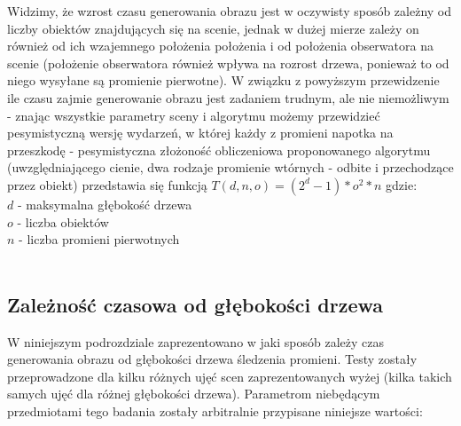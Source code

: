 Widzimy, że wzrost czasu generowania obrazu jest w oczywisty sposób zależny od liczby obiektów znajdujących się na scenie, jednak w dużej mierze zależy on również od ich wzajemnego położenia położenia i od położenia obserwatora na scenie (położenie obserwatora również wpływa na rozrost drzewa, ponieważ to od niego wysyłane są promienie pierwotne). W związku z powyższym przewidzenie ile czasu zajmie generowanie obrazu jest zadaniem trudnym, ale nie niemożliwym - znając wszystkie parametry sceny i algorytmu możemy przewidzieć pesymistyczną wersję wydarzeń, w której każdy z promieni napotka na przeszkodę - pesymistyczna złożoność obliczeniowa proponowanego algorytmu (uwzględniającego cienie, dwa rodzaje promienie wtórnych - odbite i przechodzące przez obiekt) przedstawia się funkcją $T(d,n,o) = (2^d - 1) * o^2 * n$ gdzie:
\\
$d$ - maksymalna głębokość drzewa \\
$o$ - liczba obiektów \\
$n$ - liczba promieni pierwotnych \\ 
\\

\subsection{Zależność czasowa od głębokości drzewa}

W niniejszym podrozdziale zaprezentowano w jaki sposób zależy czas generowania obrazu od głębokości drzewa śledzenia promieni. Testy zostały przeprowadzone dla kilku różnych ujęć scen zaprezentowanych wyżej (kilka takich samych ujęć dla różnej głębokości drzewa). Parametrom niebędącym przedmiotami tego badania zostały arbitralnie przypisane niniejsze wartości:

